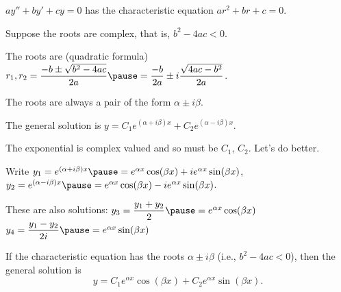 \documentclass[10pt,aspectratio=169]{beamer}
\begin{document}
\begin{frame}
$ay'' + by' + cy = 0$ has the characteristic equation $a r^2 + b r + c = 0$.

\medskip
\pause

Suppose the roots are complex, that is, $b^2 - 4ac < 0$.

\medskip
\pause

The roots are (quadratic formula)
\quad
$r_1,r_2
=
\dfrac{-b \pm \sqrt{b^2 - 4ac}}{2a}
\pause
=
\dfrac{-b}{2a} \pm i\dfrac{\sqrt{4ac - b^2}}{2a}$.

\medskip
\pause

The roots are always a pair of the form $\alpha \pm i \beta$.

\medskip
\pause

The general solution is
\quad
$y = C_1 e^{(\alpha+i\beta)x} + C_2 e^{(\alpha-i\beta)x}$.

\medskip
\pause

The exponential is complex valued and so must be $C_1$, $C_2$.
Let's do better.

\medskip
\pause

Write
\quad
$y_1
= e^{(\alpha+i\beta)x}
\pause
=
e^{\alpha x} \cos (\beta x) + i e^{\alpha x} \sin (\beta x)$,
\pause
\quad
$y_2
= e^{(\alpha-i\beta)x}
\pause
=
e^{\alpha x} \cos (\beta x) - i e^{\alpha x} \sin (\beta x)$.

\medskip
\pause

These are also solutions:
\quad
$y_3 = \dfrac{y_1 + y_2}{2}
\pause 
= e^{\alpha x} \cos (\beta x)$
\pause
\quad
$y_4  = \dfrac{y_1 - y_2}{2i}
\pause
= e^{\alpha x} \sin (\beta x)$

\pause
\begin{theorem}
If the characteristic equation has the roots $\alpha \pm i \beta$
(i.e., $b^2 - 4ac < 0$),
then the general solution is
\[
y = C_1 e^{\alpha x} \cos (\beta x) + C_2 e^{\alpha x} \sin (\beta x) .
\]
\end{theorem}
\end{frame}
\end{document}
